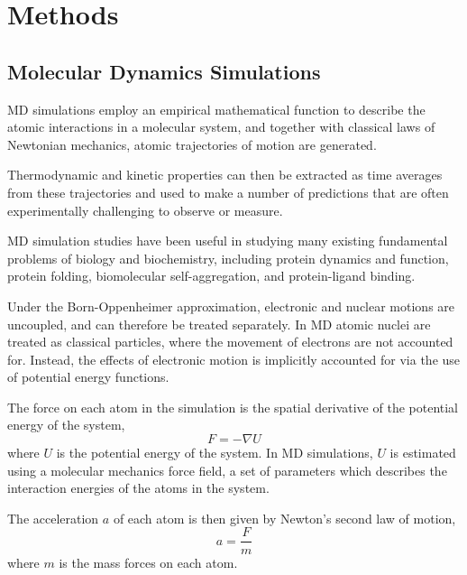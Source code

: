 \chapter{Methods}

\section{Molecular Dynamics Simulations}

MD simulations employ an empirical mathematical function to describe the atomic interactions in a molecular system, and together with classical laws of Newtonian mechanics, atomic trajectories of motion are generated. 

Thermodynamic and kinetic properties can then be extracted as time averages from these trajectories and used to make a number of predictions that are often experimentally challenging to observe or measure.

MD simulation studies have been useful in studying many existing fundamental problems of biology and biochemistry, including protein dynamics and function, protein folding, biomolecular self-aggregation, and protein-ligand binding.


Under the Born-Oppenheimer approximation, electronic and nuclear motions are uncoupled, and can therefore be treated separately. In MD atomic nuclei are treated as classical particles, where the movement of electrons are not accounted for. Instead, the effects of electronic motion is implicitly accounted for via the use of potential energy functions.

The force on each atom in the simulation is the spatial derivative of the potential energy of the system,
\begin{equation}
F = - \nabla U
\end{equation}
where $U$ is the potential energy of the system. In MD simulations, $U$ is estimated using a molecular mechanics force field, a set of parameters which describes the interaction energies of the atoms in the system.

The acceleration $a$ of each atom is then given by Newton's second law of motion,
\begin{equation}
a = \frac{F}{m}
\end{equation}
where $m$ is the mass forces on each atom.

